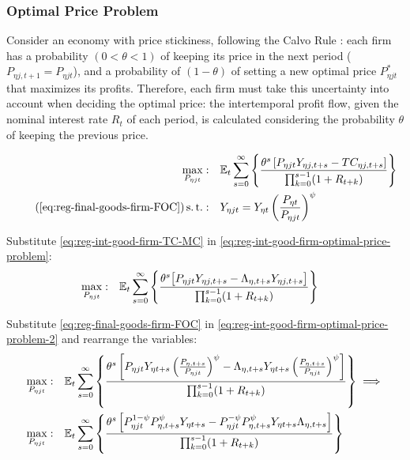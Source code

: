 \documentclass[../thesis.tex]{subfiles}
\begin{document}

\subsubsection*{Optimal Price Problem}

Consider an economy with price stickiness, following the Calvo Rule \cite{calvo_staggered_1983}: each firm has a probability $(0 < \theta < 1)$ of keeping its price in the next period ($P_{\eta j,t+1} = P_{\eta jt}$), and a probability of $(1 - \theta)$ of setting a new optimal price $P_{\eta jt}^{\ast}$ that maximizes its profits. Therefore, each firm must take this uncertainty into account when deciding the optimal price: the intertemporal profit flow, given the nominal interest rate $R_{t}$ of each period, is calculated considering the probability $\theta$ of keeping the previous price.

\begin{align}
	\label{eq:reg-int-good-firm-optimal-price-problem}
	\max_{P_{\eta jt}}: & \quad \E \sum_{s=0}^{\infty} \left\{ \frac{ \theta^s \left[ P_{\eta jt} Y_{\eta j,t+s} - TC_{\eta j,t+s} \right]}{\prod_{k=0}^{s-1}(1+R_{t+k})} \right\} \\
	\tag{\ref{eq:reg-final-goods-firm-FOC}}
	\st: & \quad Y_{\eta jt} = Y_{\eta t} \left( \frac{P_{\eta t}}{P_{\eta jt}} \right)^{\psi}
\end{align}


Substitute \ref{eq:reg-int-good-firm-TC-MC} in \ref{eq:reg-int-good-firm-optimal-price-problem}:
\begin{align}
	\label{eq:reg-int-good-firm-optimal-price-problem-2}
	\max_{P_{\eta jt}}: & \quad {\mathbb{E}_{t}} \sum_{s=0}^{\infty} \left\{ \frac{\theta^s \big[ P_{\eta jt} Y_{\eta j,t+s} - \Lambda_{\eta, t+s} Y_{\eta j,t+s} \big]}{\prod_{k=0}^{s-1}(1+R_{t+k})} \right\}
\end{align}

Substitute \ref{eq:reg-final-goods-firm-FOC} in \ref{eq:reg-int-good-firm-optimal-price-problem-2} and rearrange the variables:
\begin{align}
	\max_{P_{\eta jt}}: & \quad {\mathbb{E}_{t}} \sum_{s=0}^{\infty} \left\{ \frac{\theta^s \left[ P_{\eta jt} Y_{\eta t+s} \left( \frac{P_{\eta, t+s}}{P_{\eta jt}} \right)^{\psi} - \Lambda_{\eta, t+s} Y_{\eta t+s} \left( \frac{P_{\eta, t+s}}{P_{\eta jt}} \right)^{\psi} \right]}{\prod_{k=0}^{s-1}(1+R_{t+k})} \right\} \implies \nonumber 
	\\
	\max_{P_{\eta jt}}: & \quad {\mathbb{E}_{t}} \sum_{s=0}^{\infty} \left\{ \frac{\theta^s \left[ P_{\eta jt}^{1-\psi} P_{\eta, t+s}^{\psi} Y_{\eta t+s} - P_{\eta jt}^{-\psi} P_{\eta, t+s}^{\psi} Y_{\eta t+s} \Lambda_{\eta, t+s} \right]}{\prod_{k=0}^{s-1}(1+R_{t+k})} \right\} \nonumber
\end{align}
\end{document}

